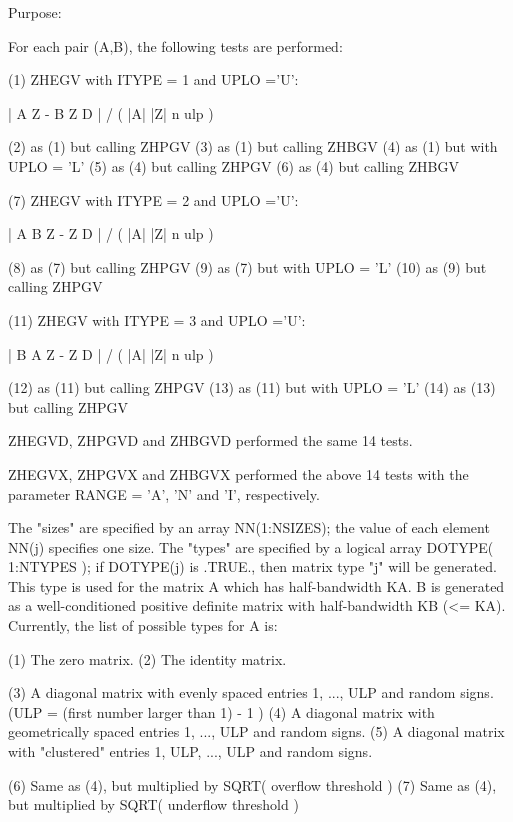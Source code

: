 \begin{DoxyParagraph}{Purpose\+: }
\begin{DoxyVerb}
      For each pair (A,B), the following tests are performed:

      (1) ZHEGV with ITYPE = 1 and UPLO ='U':

              | A Z - B Z D | / ( |A| |Z| n ulp )

      (2) as (1) but calling ZHPGV
      (3) as (1) but calling ZHBGV
      (4) as (1) but with UPLO = 'L'
      (5) as (4) but calling ZHPGV
      (6) as (4) but calling ZHBGV

      (7) ZHEGV with ITYPE = 2 and UPLO ='U':

              | A B Z - Z D | / ( |A| |Z| n ulp )

      (8) as (7) but calling ZHPGV
      (9) as (7) but with UPLO = 'L'
      (10) as (9) but calling ZHPGV

      (11) ZHEGV with ITYPE = 3 and UPLO ='U':

              | B A Z - Z D | / ( |A| |Z| n ulp )

      (12) as (11) but calling ZHPGV
      (13) as (11) but with UPLO = 'L'
      (14) as (13) but calling ZHPGV

      ZHEGVD, ZHPGVD and ZHBGVD performed the same 14 tests.

      ZHEGVX, ZHPGVX and ZHBGVX performed the above 14 tests with
      the parameter RANGE = 'A', 'N' and 'I', respectively.

      The "sizes" are specified by an array NN(1:NSIZES); the value of
      each element NN(j) specifies one size.
      The "types" are specified by a logical array DOTYPE( 1:NTYPES );
      if DOTYPE(j) is .TRUE., then matrix type "j" will be generated.
      This type is used for the matrix A which has half-bandwidth KA.
      B is generated as a well-conditioned positive definite matrix
      with half-bandwidth KB (<= KA).
      Currently, the list of possible types for A is:

      (1)  The zero matrix.
      (2)  The identity matrix.

      (3)  A diagonal matrix with evenly spaced entries
           1, ..., ULP  and random signs.
           (ULP = (first number larger than 1) - 1 )
      (4)  A diagonal matrix with geometrically spaced entries
           1, ..., ULP  and random signs.
      (5)  A diagonal matrix with "clustered" entries 1, ULP, ..., ULP
           and random signs.

      (6)  Same as (4), but multiplied by SQRT( overflow threshold )
      (7)  Same as (4), but multiplied by SQRT( underflow threshold )


\end{DoxyVerb}
\end{DoxyParagraph}
